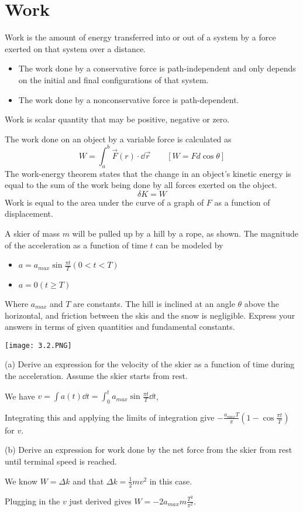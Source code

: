 \documentclass[../mech.tex]{subfiles}
\begin{document}
\section{Work}
Work is the amount of energy transferred into or out of a system by a force exerted on that system over a distance.
\begin{itemize}
    \item The work done by a conservative force is path-independent and only depends on the initial and final configurations of that system.
    \item The work done by a nonconservative force is path-dependent.
\end{itemize}

Work is scalar quantity that may be positive, negative or zero.

The work done on an object by a variable force is calculated as 
\[ W=\int_a^b \vec{F}(r)\cdot \dd \vec{r} \qquad [W=Fd\cos\theta] \]
The work-energy theorem states that the change in an object's kinetic energy is equal to the sum of the work being done by all forces exerted on the object.
\[ \delta K = W \]
Work is equal to the area under the curve of a graph of $F$ as a function of displacement.

\begin{example}
    A skier of mass $m$ will be pulled up by a hill by a rope, as shown. The magnitude of the acceleration as a function of time $t$ can be modeled by 
    \begin{itemize}
        \item $a=a_{max}\sin \frac{\pi t}{T} (0<t<T)$
        \item $a=0 (t\geq T)$
    \end{itemize}
    Where $a_{max}$ and $T$ are constants. The hill is inclined at an angle $\theta$ above the horizontal, and friction between the skis and the snow is negligible. Express your answers in terms of given quantities and fundamental constants.
    \begin{center}
        \texttt{[image: 3.2.PNG]}
    \end{center}

    (a) Derive an expression for the velocity of the skier as a function of time during the acceleration. Assume the skier starts from rest.

    We have $v=\int a(t)\dd t = \int_0^t a_{max}\sin \frac{\pi t}{T} \dd t$,

    Integrating this and applying the limits of integration give $-\frac{a_{max}T}{\pi}\left(1-\cos\frac{\pi t}{T}\right)$ for $v$.

    (b) Derive an expression for work done by the net force from the skier from rest until terminal speed is reached.

    We know $W=\Delta k$ and that $\Delta k = \frac{1}{2}mv^2$ in this case.

    Plugging in the $v$ just derived gives $W=-2a_{max}m\frac{T^2}{\pi^2}$.
\end{example}
\end{document}
